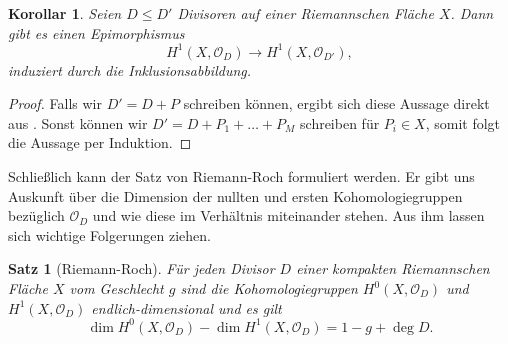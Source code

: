 \documentclass[11pt,a4paper,toc=bibliography]{scrartcl}
\theoremstyle{def}
\theoremstyle{thm}
\newtheorem{satz}[defi]{Satz}
\newtheorem{koro}[defi]{Korollar}
\theoremstyle{remark}
\begin{document}
\begin{koro}
Seien $D\leq D'$ Divisoren auf einer Riemannschen Fläche $X$. Dann gibt es einen Epimorphismus
\[ H^1(X,\mathcal{O}_D)\rightarrow H^1(X,\mathcal{O}_{D'}),\]
induziert durch die Inklusionsabbildung.
\end{koro}
\begin{proof}
    Falls wir $D'=D+P$ schreiben können, ergibt sich diese Aussage direkt aus . Sonst können wir $D'=D+P_1+\ldots+P_M$ schreiben für $P_i\in X$, somit folgt die Aussage per Induktion.
\end{proof}

Schließlich kann der Satz von Riemann-Roch formuliert werden. Er gibt uns Auskunft über die Dimension der nullten und ersten Kohomologiegruppen bezüglich $\mathcal{O}_D$ und wie diese im Verhältnis miteinander stehen. Aus ihm lassen sich wichtige Folgerungen ziehen.
\begin{satz}[Riemann-Roch]
Für jeden Divisor $D$ einer kompakten Riemannschen Fläche $X$ vom Geschlecht $g$ sind die Kohomologiegruppen $H^0(X,\mathcal{O}_D)$ und $H^1(X,\mathcal{O}_D)$ endlich-dimensional und es gilt
\[
\dim H^0(X,\mathcal{O}_D)-\dim H^1(X,\mathcal{O}_D)=1-g+\deg D.
\]
\end{satz}
\end{document}
